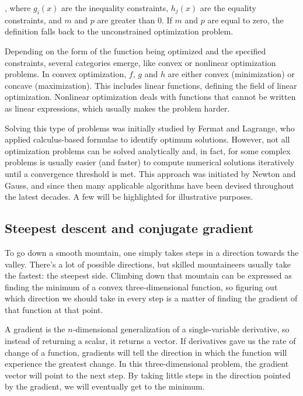 , where  \( g_{i}(x)  \)  are the inequality constraints,  \( h_{j}(x)  \)  are the equality constraints, and  \( m \)  and  \( p \)  are greater than 0. If  \( m \)  and  \( p \)  are equal to zero, the definition falls back to the unconstrained optimization problem.

Depending on the form of the function being optimized and the specified constraints, several categories emerge, like convex or nonlinear optimization problems. In convex optimization, $f$, $g$ and $h$ are either convex (minimization) or concave (maximization). This includes linear functions, defining the field of linear optimization. Nonlinear optimization deals with functions that cannot be written as linear expressions, which usually makes the problem harder.

Solving this type of problems was initially studied by Fermat and Lagrange, who applied calculus-based formulae to identify optimum solutions. However, not all optimization problems can be solved analytically and, in fact, for some complex problems is usually easier (and faster) to compute numerical solutions iteratively until a convergence threshold is met. This approach was initiated by Newton and Gauss, and since then many applicable algorithms have been devised throughout the latest decades. A few will be highlighted for illustrative purposes.

\subsection{Steepest descent and conjugate gradient}
To go down a smooth mountain, one simply takes steps in a direction towards the valley. There's a lot of possible directions, but skilled mountaineers usually take the fastest: the steepest side. Climbing down that mountain can be expressed as finding the minimum of a convex three-dimensional function, so figuring out which direction we should take in every step is a matter of finding the gradient of that function at that point.

A gradient is the $n$-dimensional generalization of a single-variable derivative, so instead of returning a scalar, it returns a vector. If derivatives gave us the rate of change of a function, gradients will tell the direction in which the function will experience the greatest change. In this three-dimensional problem, the gradient vector will point to the next step. By taking little steps in the direction pointed by the gradient, we will eventually get to the minimum.

